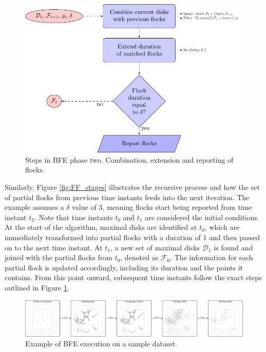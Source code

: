 \begin{figure}
    \centering
    \includegraphics[width=\linewidth]{figures/FF_flowchart}
    \caption{Steps in BFE phase two. Combination, extension and reporting of flocks.}\label{fig:FF_flowchart}
\end{figure}

Similarly, Figure \ref{fig:FF_stages} illustrates the recursive process and how the set of partial flocks from previous time instants feeds into the next iteration. The example assumes a $\delta$ value of 3, meaning flocks start being reported from time instant $t_2$. Note that time instants $t_0$ and $t_1$ are considered the initial conditions. At the start of the algorithm, maximal disks are identified at $t_0$, which are immediately transformed into partial flocks with a duration of 1 and then passed on to the next time instant. At $t_1$, a new set of maximal disks $\mathcal{D}_1$ is found and joined with the partial flocks from $t_0$, denoted as $\mathcal{F}_0$. The information for each partial flock is updated accordingly, including its duration and the points it contains. From this point onward, subsequent time instants follow the exact steps outlined in Figure \ref{fig:FF_flowchart}.

\begin{figure}
    \centering
    \includegraphics[width=\linewidth]{figures/MF_stages/flow}
    \caption{Example of BFE execution on a sample dataset.}\label{fig:example}
\end{figure}


